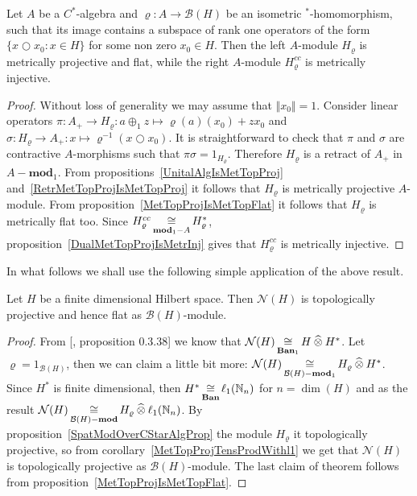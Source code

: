 \begin{proposition}\label{SpatModOverCStarAlgProp} Let $A$ be a $C^*$-algebra
and $\varrho:A\to\mathcal{B}(H)$ be an isometric ${}^*$-homomorphism, such that
its image contains a subspace of rank one operators of the 
form $ \{x\bigcirc x_0:x\in H \}$ for some non zero $x_0\in H$. 
Then the left $A$-module $H_\varrho$ is metrically projective and flat, 
while the  right $A$-module $H_\varrho^{cc}$ is metrically injective.
\end{proposition}
\begin{proof} Without loss of generality we may assume that $\Vert x_0\Vert=1$.
Consider linear operators 
$\pi:A_+\to H_\varrho:a\oplus_1 z\mapsto \varrho(a)(x_0)+zx_0$ 
and $\sigma:H_\varrho\to A_+:x\mapsto \varrho^{-1}(x\bigcirc x_0)$. 
It is straightforward to check that $\pi$ and
$\sigma$ are contractive $A$-morphisms such that $\pi\sigma=1_{H_\varrho}$.
Therefore $H_\varrho$ is a retract of $A_+$ in $A-\mathbf{mod}_1$. From
propositions~\ref{UnitalAlgIsMetTopProj} and~\ref{RetrMetTopProjIsMetTopProj} it
follows that $H_\varrho$ is metrically projective $A$-module. From
proposition~\ref{MetTopProjIsMetTopFlat} it follows that $H_\varrho$ is
metrically flat too. Since $H_\varrho^{cc}\mathop{\mathbin{\cong}}\limits_{\mathbf{mod}_1-A}H_\varrho^*$,
proposition~\ref{DualMetTopProjIsMetrInj} gives that $H_\varrho^{cc}$ is
metrically injective.
\end{proof}

In what follows we shall use the following simple application of the above
result.

\begin{proposition}\label{FinDimNHModTopProjFlat} Let $H$ be a finite
dimensional Hilbert space. Then $\mathcal{N}(H)$ is topologically projective and
hence flat as $\mathcal{B}(H)$-module.
\end{proposition}
\begin{proof} From [\cite{HelBanLocConvAlg}, proposition 0.3.38] we know that
$\mathcal{N}(H)\mathop{\mathbin{\cong}}\limits_{\mathbf{Ban}_1}H\mathbin{\widehat{\otimes}} H^*$. Let
$\varrho=1_{\mathcal{B}(H)}$, then we can claim a little bit more:
$\mathcal{N}(H)\mathop{\mathbin{\cong}}\limits_{\mathcal{B}(H)-\mathbf{mod}_1} H_\varrho\mathbin{\widehat{\otimes}} H^*$.
Since $H^*$ is finite dimensional, then
$H^*\mathop{\mathbin{\cong}}\limits_{\mathbf{Ban}}\ell_1(\mathbb{N}_n)$ for $n=\dim(H)$ and as the result
$\mathcal{N}(H)\mathop{\mathbin{\cong}}\limits_{\mathcal{B}(H)-\mathbf{mod}}
H_\varrho\mathbin{\widehat{\otimes}}\ell_1(\mathbb{N}_n)$. By
proposition~\ref{SpatModOverCStarAlgProp} the module $H_\varrho$ it
topologically projective, so from corollary~\ref{MetTopProjTensProdWithl1} we
get that $\mathcal{N}(H)$ is topologically projective as
$\mathcal{B}(H)$-module. The last claim of theorem follows from
proposition~\ref{MetTopProjIsMetTopFlat}.
\end{proof}

